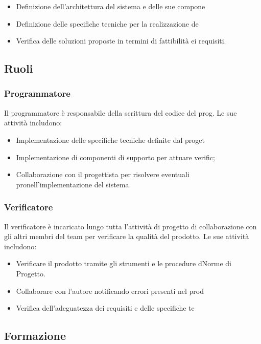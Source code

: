 \begin{itemize}
\item Definizione dell'architettura del sistema e delle sue compone\
\item Definizione delle specifiche tecniche per la realizzazione de\
\item Verifica delle soluzioni proposte in termini di fattibilità e\n i requisiti.
\end{itemize}

\subsection{Ruoli}

\subsubsection{Programmatore}

Il programmatore è responsabile della scrittura del codice del prog\e. Le sue attività includono:

\begin{itemize}
\item Implementazione delle specifiche tecniche definite dal proget\
\item Implementazione di componenti di supporto per attuare verific\one;
\item Collaborazione con il progettista per risolvere eventuali pro\iscontrate nell'implementazione del sistema.
\end{itemize}

\subsubsection{Verificatore}

Il verificatore è incaricato lungo tutta l'attività di progetto di \stretta collaborazione con gli altri membri del team per verificare la qualità del prodotto. Le sue attività includono:

\begin{itemize}
\item Verificare il prodotto tramite gli strumenti e le procedure d\e Norme di Progetto.
\item Collaborare con l'autore notificando errori presenti nel prod\
\item Verifica dell'adeguatezza dei requisiti e delle specifiche te\
\end{itemize}

\subsection{Formazione}

